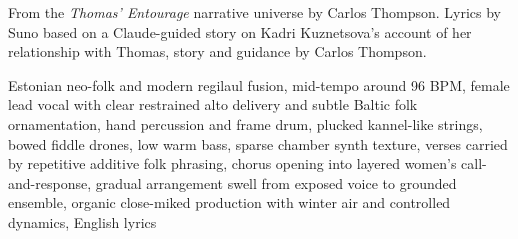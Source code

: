 
\begin{notes}
From the \emph{Thomas' Entourage} narrative universe by Carlos Thompson. Lyrics by Suno based on a Claude-guided story on Kadri Kuznetsova's account of her relationship with Thomas, story and guidance by Carlos Thompson.
\end{notes}
\begin{style}
Estonian neo-folk and modern regilaul fusion, mid-tempo around 96 BPM, female lead vocal with clear restrained alto delivery and subtle Baltic folk ornamentation, hand percussion and frame drum, plucked kannel-like strings, bowed fiddle drones, low warm bass, sparse chamber synth texture, verses carried by repetitive additive folk phrasing, chorus opening into layered women’s call-and-response, gradual arrangement swell from exposed voice to grounded ensemble, organic close-miked production with winter air and controlled dynamics, English lyrics
\end{style}
